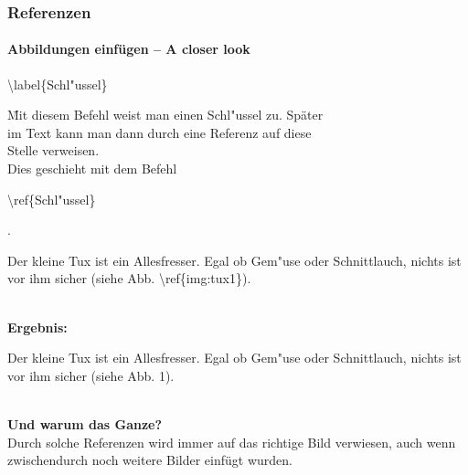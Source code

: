 
\begin{frame}
\frametitle{Referenzen}
\framesubtitle{Abbildungen einfügen – A closer look}
\begin{tabbing}
\begin{ttfamily}\color{nounibaredI}\textbackslash label\color{black}\{Schl"ussel\}\end{ttfamily} \= Mit diesem Befehl weist man einen Schl"ussel zu. Später\\
\> im Text kann man dann durch eine Referenz auf diese\\
\> Stelle verweisen.\\
\> Dies geschieht mit dem Befehl
\begin{ttfamily}\color{nounibaredI}\textbackslash ref\color{black}\{Schl"ussel\}\end{ttfamily}.
\end{tabbing}
\begin{ttfamily}Der kleine Tux ist ein Allesfresser. Egal ob Gem"use oder
Schnittlauch, nichts ist vor ihm sicher (siehe Abb.
\color{nounibaredI}\textbackslash ref\color{black}\{img:tux1\}).\end{ttfamily}\\[3mm]
\textbf{Ergebnis:}\\[3mm]
\begin{minipage}{\textwidth}\begin{rm}
Der kleine Tux ist ein Allesfresser. Egal ob Gem"use oder
Schnittlauch, nichts ist vor ihm sicher (siehe Abb.
1).\end{rm} \end{minipage}\\[3mm]
\textbf{Und warum das Ganze?}\\
Durch solche Referenzen wird immer auf das richtige Bild verwiesen, auch wenn zwischendurch noch weitere Bilder einfügt wurden.
\end{frame}


